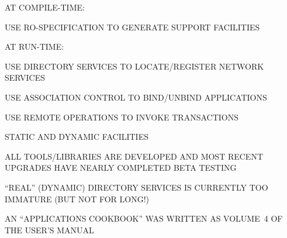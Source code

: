 \begin{bwslide}

\begin{nrtc}
\item	AT COMPILE-TIME:
    \begin{nrtc}
    \item	USE RO-SPECIFICATION TO GENERATE SUPPORT FACILITIES
    \end{nrtc}

\item	AT RUN-TIME:
    \begin{nrtc}
    \item	USE DIRECTORY SERVICES TO LOCATE/REGISTER NETWORK SERVICES

    \item	USE ASSOCIATION CONTROL TO BIND/UNBIND APPLICATIONS

    \item	USE REMOTE OPERATIONS TO INVOKE TRANSACTIONS
    \end{nrtc}
\end{nrtc}
\end{bwslide}






\begin{bwslide}

\begin{nrtc}
\item	STATIC AND DYNAMIC FACILITIES
    \begin{nrtc}
    \item	ALL TOOLS/LIBRARIES ARE DEVELOPED AND MOST RECENT UPGRADES
		HAVE NEARLY COMPLETED BETA TESTING

    \item	``REAL'' (DYNAMIC) DIRECTORY SERVICES IS CURRENTLY TOO
		IMMATURE (BUT NOT FOR LONG!)
    \end{nrtc}

\item	AN ``APPLICATIONS COOKBOOK'' WAS WRITTEN AS VOLUME~4 OF THE USER'S
	MANUAL
\end{nrtc}
\end{bwslide}


